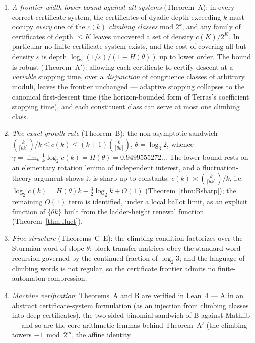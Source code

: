 \documentclass[11pt]{article}
\theoremstyle{definition}
\newcommand{\ceil}[1]{\lceil #1\rceil}
\begin{document}
\begin{enumerate}
\item[(i)] \emph{A frontier-width lower bound against all systems}
  (Theorem~A): in every correct certificate system, the certificates of
  dyadic depth exceeding $k$ must occupy \emph{every} one of the $c(k)$
  \emph{climbing classes} mod $2^k$, and any family of certificates of
  depth $\le K$ leaves uncovered a set of density $c(K)/2^K$. In
  particular no finite certificate system exists, and the cost of covering
  all but density $\varepsilon$ is depth $\log_2(1/\varepsilon)/(1-H(\theta))$
  up to lower order. The bound is robust (Theorem~A$'$): allowing each
  certificate to certify descent at a \emph{variable} stopping time, over a
  \emph{disjunction} of congruence classes of arbitrary moduli, leaves the
  frontier unchanged --- adaptive stopping collapses to the canonical
  first-descent time (the horizon-bounded form of Terras's coefficient
  stopping time), and each constituent class can serve at most one
  climbing class.
\item[(ii)] \emph{The exact growth rate} (Theorem~B): the non-asymptotic
  sandwich
  $\binom{k}{\ceil{\theta k}}/k \le c(k)\le (k+1)\binom{k}{\ceil{\theta k}}$,
  $\theta=\log_3 2$, whence
  $\gamma=\lim_k \tfrac1k\log_2 c(k) = H(\theta) = 0.9499555272\ldots$
  The lower bound rests on an elementary rotation lemma of independent
  interest, and a fluctuation-theory argument shows it is sharp up to
  constants: $c(k)\asymp\binom{k}{\ceil{\theta k}}/k$, i.e.\
  $\log_2c(k)=H(\theta)k-\tfrac32\log_2k+O(1)$ (Theorem~\ref{thm:Bsharp});
  the remaining $O(1)$ term is identified, under a local ballot limit, as
  an explicit function of $\{\theta k\}$ built from the ladder-height
  renewal function (Theorem~\ref{thm:fluct}).
\item[(iii)] \emph{Fine structure} (Theorems~C--E): the climbing condition
  factorizes over the Sturmian word of slope $\theta$; block transfer
  matrices obey the standard-word recursion governed by the continued
  fraction of $\log_2 3$; and the language of climbing words is not
  regular, so the certificate frontier admits no finite-automaton
  compression.
\item[(iv)] \emph{Machine verification}: Theorems~A and B are verified
  in Lean~4 --- A in an abstract certificate-system formulation (as an
  injection from climbing classes into deep certificates), the two-sided
  binomial sandwich of B against Mathlib --- and so are the core arithmetic lemmas behind
  Theorem~A$'$ (the climbing towers $-1\bmod 2^m$, the affine identity

\end{enumerate}
\end{document}
